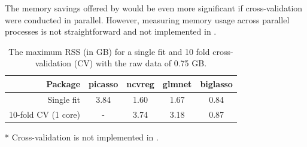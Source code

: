 The memory savings offered by  would be even more significant if cross-validation were conducted in parallel. However, measuring memory usage across parallel processes is not straightforward and not implemented in .

\begin{table}[h] 
\centering
\begin{threeparttable}
\begin{tabular}{r|cccc}
\toprule
Package & picasso\tnote{*} & ncvreg & glmnet & biglasso \\
\midrule
Single fit & 3.84 & 1.60 & 1.67 & 0.84 \\
10-fold CV (1 core) &  - &  3.74 & 3.18  & 0.87 \\
\bottomrule
\end{tabular}
\begin{tablenotes}\footnotesize
\item[*] Cross-validation is not implemented in .
\end{tablenotes}
\end{threeparttable}
\caption{The maximum RSS (in GB) for a single fit and 10 fold cross-validation (CV) with the raw data of 0.75 GB.}
\label{tab_memo}
\end{table}


